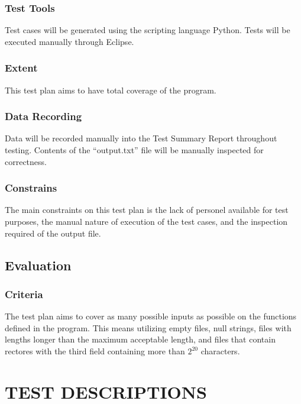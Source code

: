\documentclass[]{article}
\begin{document}
	\subsubsection{Test Tools}
	Test cases will be generated using the scripting language Python.
	Tests will be executed manually through Eclipse.
	
	\subsubsection{Extent}
	This test plan aims to have total coverage of the program.
	
	\subsubsection{Data Recording}
	Data will be recorded manually into the Test Summary Report throughout testing.
	Contents of the ``output.txt'' file will be manually inspected for correctness.
	
	\subsubsection{Constrains}
	The main constraints on this test plan is the lack of personel available for
	test purposes, the manual nature of execution of the test cases, and the
	inspection required of the output file.

\subsection{Evaluation}
	\subsubsection{Criteria}
	The test plan aims to cover as many possible inputs as possible on the
	functions defined in the program.  This means utilizing empty files, null
	strings, files with lengths longer than the maximum acceptable length, and
	files that contain rectores with the third field containing more than $2^{20}$
	characters.
	


\section{TEST DESCRIPTIONS}
\end{document}
